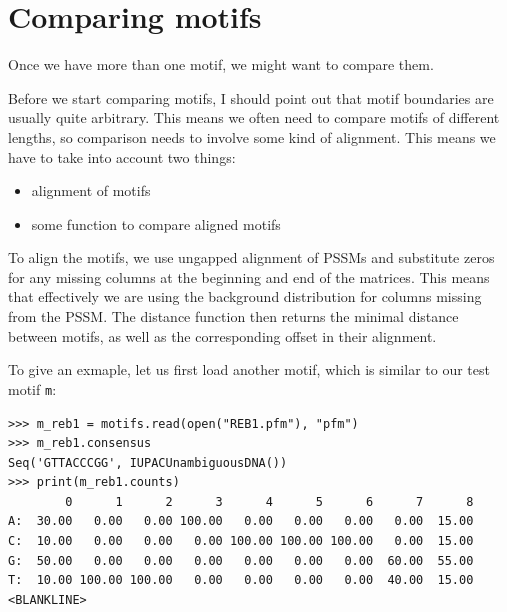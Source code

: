 \documentclass{report}
\begin{document}
\section{Comparing motifs}
\label{sec:comp}
Once we have more than one motif, we might want to compare them.

Before we start comparing motifs, I should point out that motif
boundaries are usually quite arbitrary. This means we often need
to compare motifs of different lengths, so comparison needs to involve
some kind of alignment.  This means we have to take into account two things:
\begin{itemize}
\item alignment of motifs
\item some function to compare aligned motifs
\end{itemize}
To align the motifs, we use ungapped alignment of PSSMs and substitute zeros
for any missing columns at the beginning and end of the matrices. This means
that effectively we are using the background distribution for columns missing
from the PSSM.
The distance function then returns the minimal distance between motifs, as
well as the corresponding offset in their alignment.

To give an exmaple, let us first load another motif,
which is similar to our test motif \verb|m|:
\begin{verbatim}
>>> m_reb1 = motifs.read(open("REB1.pfm"), "pfm")
>>> m_reb1.consensus
Seq('GTTACCCGG', IUPACUnambiguousDNA())
>>> print(m_reb1.counts)
        0      1      2      3      4      5      6      7      8
A:  30.00   0.00   0.00 100.00   0.00   0.00   0.00   0.00  15.00
C:  10.00   0.00   0.00   0.00 100.00 100.00 100.00   0.00  15.00
G:  50.00   0.00   0.00   0.00   0.00   0.00   0.00  60.00  55.00
T:  10.00 100.00 100.00   0.00   0.00   0.00   0.00  40.00  15.00
<BLANKLINE>
\end{verbatim}
\end{document}
